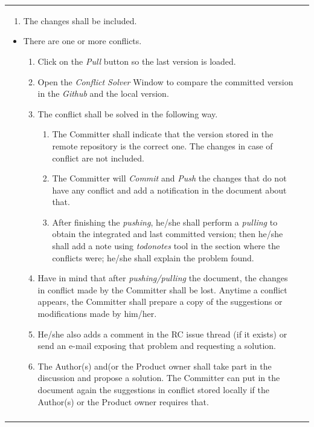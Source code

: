\documentclass{template/openetcs_article}
\begin{document}
\begin{flushleft}
\begin{supertabular}{|m{2cm}|m{13cm}|}
\begin{itemize}
\begin{itemize}
\begin{enumerate}
\item The changes shall be included.
\end{enumerate}
\end{itemize}
\begin{itemize}
\item There are one or more conflicts.
\begin{enumerate}
\item Click on the {\it Pull} button so the last version is loaded. 
\item Open the {\it Conflict Solver} Window to compare the committed version in the {\it Github} and the local version. 
\item The conflict shall be solved in the following way.
\begin{enumerate}
\item The Committer shall indicate that the version stored in the remote repository is the correct one. The changes in case of conflict are not included. 
\item The Committer will {\it Commit} and {\it Push} the changes that do not have any conflict and add a notification in the document about that. 
\item After finishing the {\it pushing}, he/she shall perform a {\it pulling} to obtain the integrated and last committed version; then he/she shall add a note using {\it todonotes} tool in the section where the conflicts were; he/she shall explain the problem found. 
\end{enumerate}
\item Have in mind that after {\it pushing/pulling} the document, the changes in conflict made by the Committer shall be lost. Anytime a conflict appears, the Committer shall prepare a copy of the suggestions or modifications made by him/her.
\item He/she also adds a comment in the RC issue thread (if it exists) or send an e-mail exposing that problem and requesting a solution.
\item The Author(s) and(or the Product owner shall take part in the discussion and propose a solution. The Committer can put in the document again the suggestions in conflict stored locally if the Author(s) or the Product owner requires that.
\end{enumerate}
\end{itemize}
\end{itemize}
\\\\\hline

\end{supertabular}
\end{flushleft}
\end{document}

